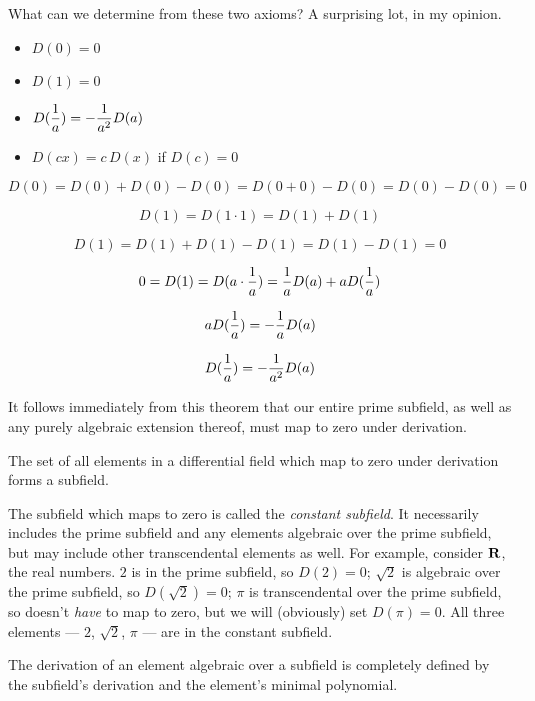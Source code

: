 What can we determine from these two axioms?  A surprising lot,
in my opinion.


\theorem\label{basic difalg}

\begin{itemize}
\item $D(0) = 0$
\item $D(1) = 0$
\item $\displaystyle{D({1\over a}) = - {1\over a^2}D(a)}$
\item $D(cx) = c\, D(x)$ if $D(c)=0$
\end{itemize}

\proof

$$D(0) = D(0) + D(0) - D(0) = D(0+0) - D(0) = D(0) - D(0) = 0$$

$$D(1) = D(1\cdot1) = D(1) + D(1)$$

$$D(1) = D(1) + D(1) - D(1) = D(1) - D(1) = 0$$

$$0 = D(1) = D(a\cdot{1\over a}) = {1\over a} D(a) + a D({1\over a})$$

$$ a D({1\over a}) = - {1\over a}D(a)$$

$$ D({1\over a}) = - {1\over a^2}D(a)$$

\endtheorem

It follows immediately from this theorem that our entire prime
subfield, as well as any purely algebraic extension thereof, must map
to zero under derivation.

\theorem

The set of all elements in a differential field which map to zero
under derivation forms a subfield.

\endtheorem

The subfield which maps to zero is called the {\it constant subfield}.
It necessarily includes the prime subfield and any elements algebraic
over the prime subfield, but may include other transcendental elements
as well.  For example, consider ${\bf R}$, the real numbers.  $2$ is
in the prime subfield, so $D(2)=0$; $\sqrt{2}$ is algebraic over the
prime subfield, so $D({\sqrt 2})=0$; $\pi$ is transcendental over the
prime subfield, so doesn't {\it have} to map to zero, but we will
(obviously) set $D(\pi)=0$.  All three elements --- $2$, ${\sqrt 2}$,
$\pi$ --- are in the constant subfield.

\theorem

The derivation of an element algebraic over a subfield is completely
defined by the subfield's derivation and the element's minimal polynomial.

